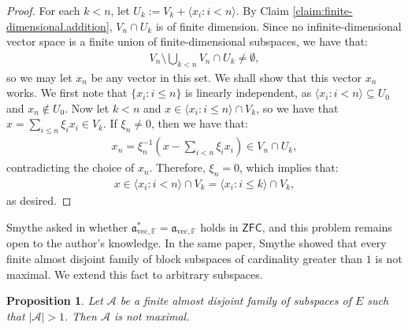 \documentclass[11pt,reqno]{amsart}
\theoremstyle{plain}
\numberwithin{equation}{section}
\newtheorem{proposition}[theorem]{Proposition}
\theoremstyle{definition}
\renewcommand{\c}[1]{\langle #1 \rangle}
\newcommand{\bb}[1]{\left( #1 \right)}
\newcommand{\cal}{\mathcal}
\renewcommand{\frak}{\mathfrak}
\newcommand{\ZFC}{\mathsf{ZFC}}
\newcommand{\A}{\cal{A}}
\newcommand{\avec}{\frak{a}_{\mathrm{vec},\mathbb{F}}}
\begin{document}
\begin{proof}
    For each $k < n$, let $U_k := V_k + \c{x_i : i < n}$. By Claim \ref{claim:finite-dimensional.addition}, $V_n \cap U_k$ is of finite dimension. Since no infinite-dimensional vector space is a finite union of finite-dimensional subspaces, we have that:
    \begin{align*}
        V_n \setminus \bigcup_{k<n} V_n \cap U_k \neq \emptyset,
    \end{align*}
    so we may let $x_n$ be any vector in this set. We shall show that this vector $x_n$ works. We first note that $\{x_i : i \leq n\}$ is linearly independent, as $\c{x_i : i < n} \subseteq U_0$ and $x_n \notin U_0$. Now let $k < n$ and $x \in \c{x_i : i \leq n} \cap V_k$, so we have that $x = \sum_{i \leq n} \xi_ix_i \in V_k$. If $\xi_n \neq 0$, then we have that:
    \begin{align*}
        x_n = \xi_n^{-1}\bb{x - \sum_{i<n}\xi_i x_i} \in V_n \cap U_k,
    \end{align*}
    contradicting the choice of $x_n$. Therefore, $\xi_n = 0$, which implies that:
    \begin{align*}
        x \in \c{x_i : i < n} \cap V_k = \c{x_i : i \leq k} \cap V_k,
    \end{align*}
    as desired.
\end{proof}

Smythe asked in \cite{S19} whether $\avec^* = \avec$ holds in $\ZFC$, and this problem remains open to the author's knowledge. In the same paper, Smythe showed that every finite almost disjoint family of block subspaces of cardinality greater than $1$ is not maximal. We extend this fact to arbitrary subspaces.

\begin{proposition}
    Let $\A$ be a finite almost disjoint family of subspaces of $E$ such that $|\A| > 1$. Then $\A$ is not maximal.
\end{proposition}
\end{document}
